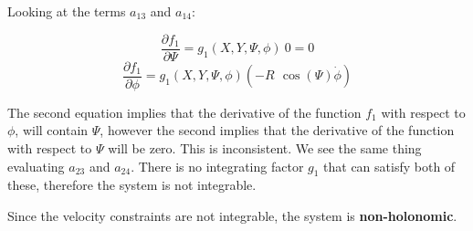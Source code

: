 \documentclass[12pt, letterpaper]{../assignment}
\begin{document}
Looking at the terms $a_{13}$ and $a_{14}$:

$$ \frac{\partial f_1}{\partial \Psi} = g_1\left(X, Y, \Psi , \phi\right)\ 0 = 0$$
$$ \frac{\partial f_1}{\partial \phi} = g_1\left(X, Y, \Psi , \phi\right) \left(-R\ \,\cos\left(\Psi\right) \dot{\phi}\right) $$

The second equation implies that the derivative of the function $f_1$ with respect to $\phi$, will contain $\Psi$, however the second implies that the derivative of the function with respect to $\Psi$ will be zero.
This is inconsistent. We see the same thing evaluating $a_{23}$ and $a_{24}$.
There is no integrating factor $g_1$ that can satisfy both of these, therefore the system is not integrable.

\begin{answer}
Since the velocity constraints are not integrable, the system is \textbf{non-holonomic}.
\end{answer}


\end{document}

